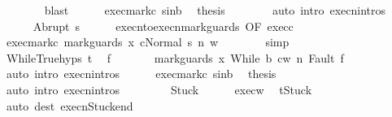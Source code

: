 \begin{isabellebody}
\ \ \ \ \ \ \isamarkupfalse%
\ blast\isanewline
\ \ \ \ \isamarkupfalse%
\ exec{\isacharunderscore}mark{\isacharunderscore}c\ s{\isacharunderscore}in{\isacharunderscore}b\ \isamarkupfalse%
\ {\isacharquery}thesis\isanewline
\ \ \ \ \ \ \isamarkupfalse%
\ {\isacharparenleft}auto\ intro{\isacharcolon}\ execn{\isachardot}intros{\isacharparenright}\isanewline
\ \ \isamarkupfalse%
\isanewline
\ \ \ \ \isamarkupfalse%
\ {\isacharparenleft}Abrupt\ s{\isacharprime}{\isacharparenright}\isanewline
\ \ \ \ \isamarkupfalse%
\ execn{\isacharunderscore}to{\isacharunderscore}execn{\isacharunderscore}mark{\isacharunderscore}guards\ {\isacharbrackleft}OF\ exec{\isacharunderscore}c{\isacharbrackright}\ \isanewline
\ \ \ \ \isamarkupfalse%
\ exec{\isacharunderscore}mark{\isacharunderscore}c{\isacharcolon}\ {\isachardoublequoteopen}{\isasymGamma}{\isasymturnstile}{\isasymlangle}mark{\isacharunderscore}guards\ x\ c{\isacharcomma}Normal\ s{\isasymrangle}\ {\isacharequal}n{\isasymRightarrow}\ w{\isachardoublequoteclose}\isanewline
\ \ \ \ \ \ \isamarkupfalse%
\ simp\isanewline
\ \ \ \ \isamarkupfalse%
\ WhileTrue{\isachardot}hyps\ t\ \isamarkupfalse%
\ f{\isacharprime}\ \isanewline
\ \ \ \ \ \ {\isachardoublequoteopen}{\isasymGamma}{\isasymturnstile}{\isasymlangle}mark{\isacharunderscore}guards\ x\ {\isacharparenleft}While\ b\ c{\isacharparenright}{\isacharcomma}w{\isasymrangle}\ {\isacharequal}n{\isasymRightarrow}\ Fault\ f{\isacharprime}{\isachardoublequoteclose}\ \isanewline
\ \ \ \ \ \ \isamarkupfalse%
\ {\isacharparenleft}auto\ intro{\isacharcolon}\ execn{\isachardot}intros{\isacharparenright}\isanewline
\ \ \ \ \isamarkupfalse%
\ exec{\isacharunderscore}mark{\isacharunderscore}c\ s{\isacharunderscore}in{\isacharunderscore}b\ \isamarkupfalse%
\ {\isacharquery}thesis\isanewline
\ \ \ \ \ \ \isamarkupfalse%
\ {\isacharparenleft}auto\ intro{\isacharcolon}\ execn{\isachardot}intros{\isacharparenright}\isanewline
\ \ \isamarkupfalse%
\isanewline
\ \ \ \ \isamarkupfalse%
\ Stuck\isanewline
\ \ \ \ \isamarkupfalse%
\ exec{\isacharunderscore}w\ \isamarkupfalse%
\ {\isachardoublequoteopen}t{\isacharequal}Stuck{\isachardoublequoteclose}\isanewline
\ \ \ \ \ \ \isamarkupfalse%
\ {\isacharparenleft}auto\ dest{\isacharcolon}\ execn{\isacharunderscore}Stuck{\isacharunderscore}end{\isacharparenright}\isanewline

\end{isabellebody}

